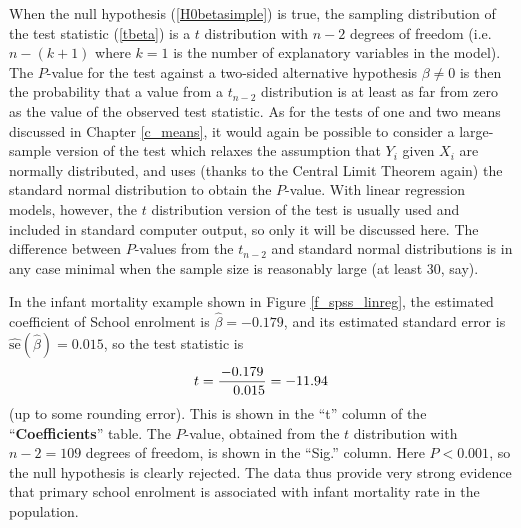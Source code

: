 When the null hypothesis (\ref{H0betasimple}) is true, the sampling
distribution of the test statistic (\ref{tbeta}) is a $t$ distribution
with $n-2$ degrees of freedom (i.e.\ $n-(k+1)$ where $k=1$ is the number
of explanatory variables in the model). The $P$-value for the test
against a two-sided alternative hypothesis $\beta\ne 0$ is then the
probability that a value from a $t_{n-2}$ distribution is at least as
far from zero as the value of the observed test statistic. As for the
tests of one and two means discussed in Chapter \ref{c_means},
it would again be possible to consider a large-sample
version of the test which relaxes the assumption that $Y_{i}$ given
$X_{i}$ are normally distributed, and uses (thanks to the Central Limit
Theorem again) the standard normal distribution to obtain the $P$-value.
With linear regression models, however, the $t$ distribution version of
the test is usually used and included in standard computer output, so
only it will be discussed here. The difference between $P$-values from
the $t_{n-2}$ and standard normal distributions is in any case minimal
when the sample size is reasonably large (at least 30, say).

In the infant mortality example shown in Figure \ref{f_spss_linreg}, the
estimated coefficient of School enrolment is
$\hat{\beta}=-0.179$, and its estimated standard error
is $\hat{\text{se}}(\hat{\beta})=0.015$, so the test statistic
is
\[
t=\frac{-0.179}{\hspace*{1em}0.015}=-11.94
\]
(up to some rounding error). This is shown in the ``t'' column of the
``\textbf{Coefficients}'' table. The $P$-value, obtained from the
$t$ distribution with $n-2=109$ degrees of freedom, is shown in the
``Sig.'' column. Here $P<0.001$, so the null hypothesis is clearly
rejected. The data thus provide very strong evidence that primary school
enrolment is associated with infant mortality rate in the population.


